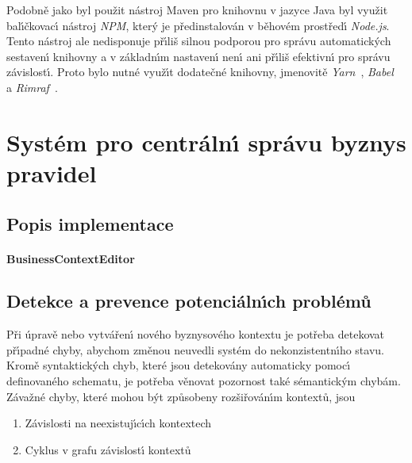 Podobně jako byl použit nástroj Maven pro knihovnu v jazyce Java byl
využit bal\'{\i}čkovac\'{\i} nástroj \textit{NPM}, kter\'y je předinstalován
v běhovém prostřed\'{\i} \textit{Node.js}. Tento nástroj ale nedisponuje
př\'{\i}liš silnou podporou pro správu automatick\'ych sestaven\'{\i} knihovny
a v základn\'{\i}m nastaven\'{\i} nen\'{\i} ani př\'{\i}liš efektivn\'{\i} pro správu závislost\'{\i}.
Proto bylo nutné využ\'{\i}t dodatečné knihovny, jmenovitě
\textit{Yarn}~\cite{yarnpkg}, \textit{Babel}~\cite{babel} a
\textit{Rimraf}~\cite{rimraf}.

\section{Systém pro centráln\'{\i} správu byznys pravidel}\label{sec:central-administration}




\subsection{Popis implementace}

\paragraph{BusinessContextEditor} %

\subsection{Detekce a prevence potenciáln\'{\i}ch problémů}

Při úpravě nebo vytvářen\'{\i} nového byznysového kontextu je
potřeba detekovat př\'{\i}padné chyby, abychom změnou neuvedli
systém do nekonzistentn\'{\i}ho stavu. Kromě syntaktick\'ych chyb,
které jsou detekovány automaticky pomoc\'{\i} definovaného schematu,
je potřeba věnovat pozornost také sémantick\'ym chybám.
Závažné chyby, které mohou b\'yt způsobeny rozšiřován\'{\i}m kontextů, jsou
\begin{enumerate}[label=\alph*)]
    \item Závislosti na neexistuj\'{\i}c\'{\i}ch kontextech
    \item Cyklus v grafu závislost\'{\i} kontextů
\end{enumerate}


